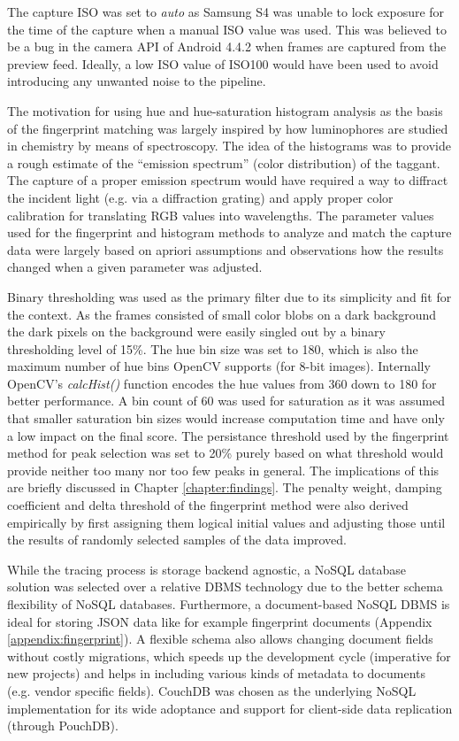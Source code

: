 \documentclass[thesis.tex]{subfiles}
\begin{document}
The capture ISO was set to \emph{auto} as Samsung S4 was unable to lock exposure for the time of the capture when a manual ISO value was used. This was believed to be a bug in the camera API of Android 4.4.2 when frames are captured from the preview feed. Ideally, a low ISO value of ISO100 would have been used to avoid introducing any unwanted noise to the pipeline.

The motivation for using hue and hue-saturation histogram analysis as the basis of the fingerprint matching was largely inspired by how luminophores are studied in chemistry by means of spectroscopy. The idea of the histograms was to provide a rough estimate of the ``emission spectrum'' (color distribution) of the taggant. The capture of a proper emission spectrum would have required a way to diffract the incident light (e.g. via a diffraction grating) and apply proper color calibration for translating RGB values into wavelengths. The parameter values used for the fingerprint and histogram methods to analyze and match the capture data were largely based on apriori assumptions and observations how the results changed when a given parameter was adjusted.

Binary thresholding was used as the primary filter due to its simplicity and fit for the context. As the frames consisted of small color blobs on a dark background the dark pixels on the background were easily singled out by a binary thresholding level of 15\%. The hue bin size was set to 180, which is also the maximum number of hue bins OpenCV supports (for 8-bit images). Internally OpenCV's \emph{calcHist()} function encodes the hue values from 360 down to 180 for better performance. A bin count of 60 was used for saturation as it was assumed that smaller saturation bin sizes would increase computation time and have only a low impact on the final score. The persistance threshold used by the fingerprint method for peak selection was set to 20\% purely based on what threshold would provide neither too many nor too few peaks in general. The implications of this are briefly discussed in Chapter \ref{chapter:findings}. The penalty weight, damping coefficient and delta threshold of the fingerprint method were also derived empirically by first assigning them logical initial values and adjusting those until the results of randomly selected samples of the data improved.

While the tracing process is storage backend agnostic, a NoSQL database solution was selected over a relative DBMS technology due to the better schema flexibility of NoSQL databases. Furthermore, a document-based NoSQL DBMS is ideal for storing JSON data like for example fingerprint documents (Appendix \ref{appendix:fingerprint}). A flexible schema also allows changing document fields without costly migrations, which speeds up the development cycle (imperative for new projects) and helps in including various kinds of metadata to documents (e.g. vendor specific fields). CouchDB was chosen as the underlying NoSQL implementation for its wide adoptance and support for client-side data replication (through PouchDB).
\end{document}
